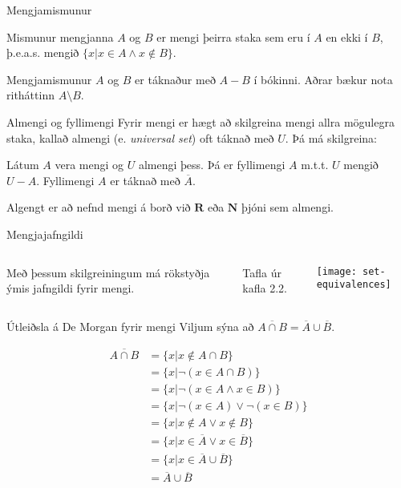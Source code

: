 \documentclass[handout]{beamer}
\begin{document}
\begin{frame}{Mengjamismunur}
\begin{tcolorbox}[title=Mengjamismunur]
Mismunur mengjanna $A$ og $B$ er mengi þeirra staka sem eru í $A$ en ekki í $B$, þ.e.a.s. mengið $\{x | x \in A \land x \notin B\}$.
\end{tcolorbox}
Mengjamismunur $A$ og $B$ er táknaður með $A - B$ í bókinni. Aðrar bækur nota ritháttinn $A \setminus B$.
\end{frame}

\begin{frame}{Almengi og fyllimengi}
Fyrir mengi er hægt að skilgreina mengi allra mögulegra staka, kallað almengi (e. \emph{universal set}) oft táknað með $U$. Þá má skilgreina:

\begin{tcolorbox}[title=Fyllimengi]
Látum $A$ vera mengi og $U$ almengi þess. Þá er fyllimengi $A$ m.t.t. $U$ mengið $U - A$. Fyllimengi $A$ er táknað með $\overline{A}$.
\end{tcolorbox}

Algengt er að nefnd mengi á borð við $\mathbf{R}$ eða $\mathbf{N}$ þjóni sem almengi.
\end{frame}

\begin{frame}{Mengjajafngildi}
\begin{columns}
Með þessum skilgreiningum má rökstyðja ýmis jafngildi fyrir mengi.

\vspace*{0.5cm}
Tafla úr kafla 2.2.
\begin{center}
\texttt{[image: set-equivalences]}
\end{center}
\end{columns}
\end{frame}

\begin{frame}{Útleiðsla á De Morgan fyrir mengi}
Viljum sýna að $\overline{A \cap B} = \overline{A} \cup \overline{B}$. \pause

\begin{align*}
\overline{A \cap B} &= \{x | x \notin A \cap B\}\\ 
&= \{x | \lnot ( x \in A \cap B)\}\\ 
&= \{x | \lnot ( x \in A \land x \in B)\}\\ 
&= \{x | \lnot ( x \in A) \lor \lnot (x \in B)\}\\ 
&= \{x | x \notin A \lor x \notin B\}\\ 
&= \{x | x \in \overline{A} \lor x \in \overline{B}\}\\ 
&= \{x | x \in \overline{A} \cup \overline{B}\}\\ 
&= \overline{A} \cup \overline{B}
\end{align*}
\end{frame}
\end{document}
